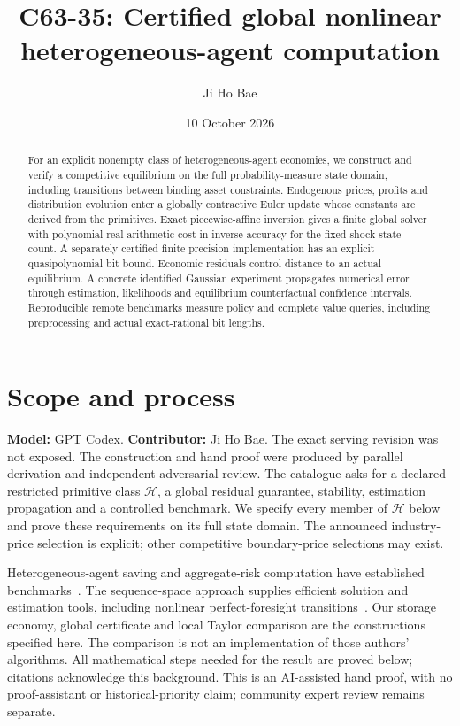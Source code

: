 \documentclass[11pt,a4paper]{article}
\title{C63-35: Certified global nonlinear\\heterogeneous-agent computation}
\author{Ji Ho Bae}
\date{10 October 2026}
\begin{document}
\maketitle
\begin{abstract}
For an explicit nonempty class of heterogeneous-agent economies, we construct
and verify a competitive equilibrium on the full probability-measure state
domain, including transitions between binding asset constraints. Endogenous
prices, profits and distribution evolution enter a globally contractive Euler
update whose constants are derived from the primitives. Exact piecewise-affine
inversion gives a finite global solver with polynomial real-arithmetic cost in
inverse accuracy for the fixed shock-state count. A separately certified finite
precision implementation has an explicit quasipolynomial bit bound. Economic
residuals control distance to an actual equilibrium. A concrete identified
Gaussian experiment propagates numerical error through estimation, likelihoods
and equilibrium counterfactual confidence intervals. Reproducible remote
benchmarks measure policy and complete value queries, including preprocessing
and actual exact-rational bit lengths.
\end{abstract}

\section*{Scope and process}
\textbf{Model:} GPT Codex. \textbf{Contributor:} Ji Ho Bae.
The exact serving revision was not exposed. The construction and hand proof
were produced by parallel derivation and independent adversarial review.
The catalogue asks for a declared restricted primitive class $\mathcal H$,
a global residual guarantee, stability, estimation propagation and a controlled
benchmark. We specify every member of $\mathcal H$ below and prove these
requirements on its full state domain. The announced industry-price selection
is explicit; other competitive boundary-price selections may exist.

Heterogeneous-agent saving and aggregate-risk computation have established
benchmarks~\cite{Aiyagari,KS,HANK}. The sequence-space approach supplies efficient
solution and estimation tools, including nonlinear perfect-foresight
transitions~\cite{ABRS}. Our storage economy, global certificate and local
Taylor comparison are the constructions specified here. The comparison is
not an implementation of those authors' algorithms. All mathematical steps
needed for the result are proved below; citations acknowledge this background.
This is an AI-assisted hand proof, with no proof-assistant or historical-priority
claim; community expert review remains separate.
\end{document}

